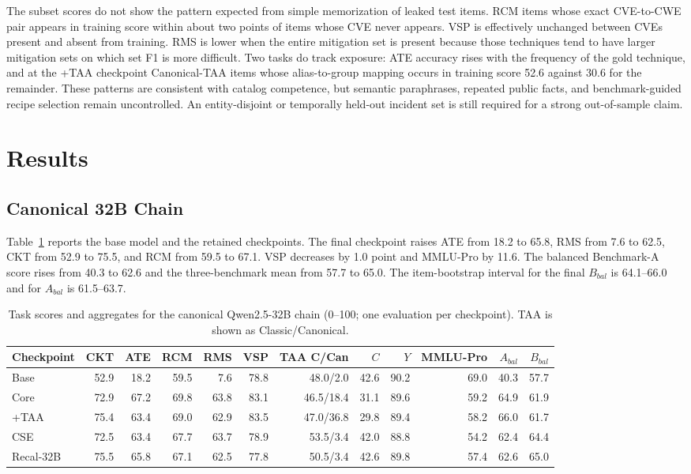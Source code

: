 \documentclass[conference]{IEEEtran}
\begin{document}
The subset scores do not show the pattern expected from simple memorization of leaked test items. RCM items whose exact CVE-to-CWE pair appears in training score within about two points of items whose CVE never appears. VSP is effectively unchanged between CVEs present and absent from training. RMS is lower when the entire mitigation set is present because those techniques tend to have larger mitigation sets on which set F1 is more difficult. Two tasks do track exposure: ATE accuracy rises with the frequency of the gold technique, and at the +TAA checkpoint Canonical-TAA items whose alias-to-group mapping occurs in training score 52.6 against 30.6 for the remainder. These patterns are consistent with catalog competence, but semantic paraphrases, repeated public facts, and benchmark-guided recipe selection remain uncontrolled. An entity-disjoint or temporally held-out incident set is still required for a strong out-of-sample claim.

\section{Results}
\subsection{Canonical 32B Chain}
Table~\ref{tab:mainresults} reports the base model and the retained checkpoints. The final checkpoint raises ATE from 18.2 to 65.8, RMS from 7.6 to 62.5, CKT from 52.9 to 75.5, and RCM from 59.5 to 67.1. VSP decreases by 1.0 point and MMLU-Pro by 11.6. The balanced Benchmark-A score rises from 40.3 to 62.6 and the three-benchmark mean from 57.7 to 65.0. The item-bootstrap interval for the final $B_{bal}$ is 64.1--66.0 and for $A_{bal}$ is 61.5--63.7.

\begin{table}[t]
\caption{Task scores and aggregates for the canonical Qwen2.5-32B chain (0--100; one evaluation per checkpoint). TAA is shown as Classic/Canonical.}
\label{tab:mainresults}
\centering
\scriptsize
\setlength{\tabcolsep}{3.0pt}
\begin{tabular}{@{}lrrrrrrrrrrr@{}}
\toprule
Checkpoint & CKT & ATE & RCM & RMS & VSP & TAA C/Can & $C$ & $Y$ & MMLU-Pro & $A_{bal}$ & $B_{bal}$ \\
\midrule
Base & 52.9 & 18.2 & 59.5 & 7.6 & 78.8 & 48.0/2.0 & 42.6 & 90.2 & 69.0 & 40.3 & 57.7 \\
Core & 72.9 & 67.2 & 69.8 & 63.8 & 83.1 & 46.5/18.4 & 31.1 & 89.6 & 59.2 & 64.9 & 61.9 \\
+TAA & 75.4 & 63.4 & 69.0 & 62.9 & 83.5 & 47.0/36.8 & 29.8 & 89.4 & 58.2 & 66.0 & 61.7 \\
CSE & 72.5 & 63.4 & 67.7 & 63.7 & 78.9 & 53.5/3.4 & 42.0 & 88.8 & 54.2 & 62.4 & 64.4 \\
Recal-32B & 75.5 & 65.8 & 67.1 & 62.5 & 77.8 & 50.5/3.4 & 42.6 & 89.8 & 57.4 & 62.6 & 65.0 \\
\bottomrule
\end{tabular}
\end{table}
\end{document}
